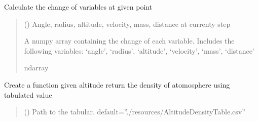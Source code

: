 \documentclass[letterpaper,10pt,english]{sphinxmanual}
\begin{document}
\begin{fulllineitems}
\begin{fulllineitems}
\begin{quote}
\begin{description}
\begin{itemize}
\end{itemize}

\end{description}\end{quote}

\end{fulllineitems}


\begin{fulllineitems}
\label{\detokenize{index:solver.Planet.calculator_rk4}}
\pysigstartsignatures
{}
\pysigstopsignatures
\sphinxAtStartPar
Calculate the change of variables at given point
\begin{quote}\begin{description}
\sphinxAtStartPar
{} () \textendash{} Angle, radius, altitude, velocity, mass, distance at currenty step

\sphinxAtStartPar
{} \textendash{} A numpy array containing the change of each variable.
Includes the following variables:
‘angle’, ‘radius’, ‘altitude’,
‘velocity’, ‘mass’, ‘distance’

\sphinxAtStartPar
ndarray

\end{description}\end{quote}

\end{fulllineitems}


\begin{fulllineitems}
\label{\detokenize{index:solver.Planet.create_tabular_density}}
\pysigstartsignatures
{}
\pysigstopsignatures
\sphinxAtStartPar
Create a function given altitude return the density of atomosphere
using tabulated value
\begin{quote}\begin{description}
\sphinxAtStartPar
{} (\sphinxstyleliteralemphasis{\sphinxupquote{, }}) \textendash{} Path to the tabular. default=”./resources/AltitudeDensityTable.csv”


\end{description}
\end{quote}
\end{fulllineitems}
\end{fulllineitems}
\end{document}
